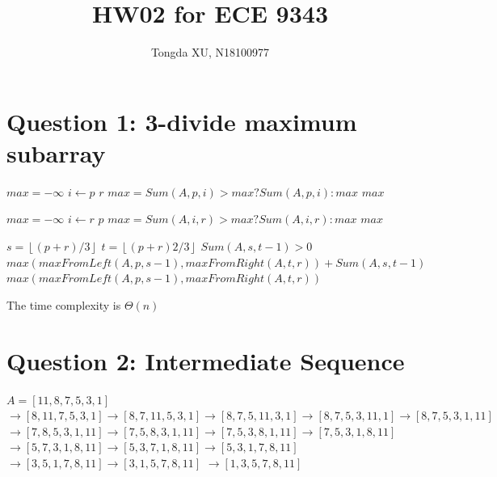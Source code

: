 \documentclass[]{article}
\title{HW02 for ECE 9343}
\author{Tongda XU, N18100977}
\begin{document}
\maketitle

\section{Question 1: 3-divide maximum subarray}

\begin{codebox}
	\li $max = -\infty$
	\li \For $i \gets p$ \To $r$
	\li		\Do $max = Sum(A,p,i)>max?Sum(A,p,i):max$
 		\End
	\li \Return $max$
\end{codebox}

\begin{codebox}
	\li $max = -\infty$
	\li \For $i \gets r$ \Downto $p$
	\li		\Do $max = Sum(A,i,r)>max?Sum(A,i,r):max$
	\End
	\li \Return $max$
\end{codebox}

\begin{codebox}
	\li $s = \left \lfloor (p+r)/3 \right \rfloor$
	\li $t = \left \lfloor (p+r)2/3 \right \rfloor$
	\li \If $Sum(A,s,t-1) > 0$
	\li 	\Then \Return $max(maxFromLeft(A, p, s-1), maxFromRight(A, t, r)) + Sum(A,s,t-1)$
	\li	\Else \Return $max(maxFromLeft(A, p, s-1), maxFromRight(A, t, r))$
	\End
\end{codebox}

The time complexity is $\Theta(n)$

\section{Question 2: Intermediate Sequence}

\begin{codebox}
	\li $A = [11, 8, 7, 5, 3, 1] $
	\li $\rightarrow [8, 11, 7, 5, 3, 1] \rightarrow [8, 7, 11, 5, 3, 1] \rightarrow [8, 7, 5, 11, 3, 1] 
	\rightarrow [8, 7, 5, 3, 11, 1] \rightarrow [8, 7, 5, 3, 1, 11]$
	\li $\rightarrow [7, 8, 5, 3, 1, 11] \rightarrow [7, 5, 8, 3, 1, 11] \rightarrow [7, 5, 3, 8, 1, 11]\rightarrow [7, 5, 3, 1, 8, 11]$
	\li $\rightarrow [5, 7, 3, 1, 8, 11] \rightarrow [5, 3, 7, 1, 8, 11] \rightarrow [5, 3, 1, 7, 8, 11]$	
	\li $\rightarrow [3, 5, 1, 7, 8, 11]\rightarrow [3, 1, 5, 7, 8, 11] $
	\li $\rightarrow [1, 3, 5, 7, 8, 11]$
\end{codebox}
\end{document}
